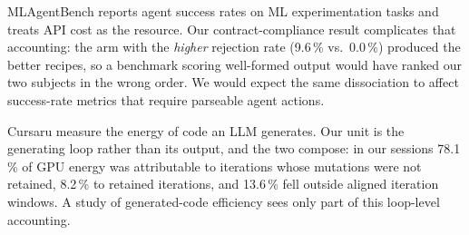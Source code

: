 MLAgentBench \cite{huang2024mlagentbench} reports agent success rates on ML
experimentation tasks and treats API cost as the resource. Our contract-compliance
result complicates that accounting: the arm with the \emph{higher} rejection rate
(9.6\,\% vs.\ 0.0\,\%) produced the better recipes, so a benchmark scoring
well-formed output would have ranked our two subjects in the wrong order. We would
expect the same dissociation to affect success-rate metrics that require parseable
agent actions.

Cursaru \etal \cite{cursaru2024codellama} measure the energy of code an LLM
generates. Our unit is the generating loop rather than its output, and the two
compose: in our sessions 78.1\,\% of GPU energy was attributable to iterations
whose mutations were not retained, 8.2\,\% to retained iterations, and 13.6\,\%
fell outside aligned iteration windows. A study of generated-code efficiency sees
only part of this loop-level accounting.
